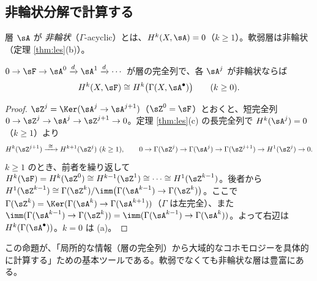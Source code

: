 \subsection{非輪状分解で計算する}
\begin{defn}
層 $\sA$ が \emph{非輪状}（$\Gamma$-acyclic）とは、$H^k(X,\sA)=0$（$k\ge1$）。軟弱層は非輪状（定理 \ref{thm:les}(b)）。
\end{defn}
\begin{prop}[非輪状分解定理]\label{prop:acyclic}\tP
$0\to\sF\to\sA^0\xrightarrow{d}\sA^1\xrightarrow{d}\cdots$ が層の完全列で、各 $\sA^j$ が非輪状ならば
\[
H^k(X,\sF)\cong H^k\big(\Gamma(X,\sA^\bullet)\big)\qquad(k\ge0).
\]
\end{prop}
\begin{proof}
$\sZ^j=\Ker(\sA^j\to\sA^{j+1})$（$\sZ^0=\sF$）とおくと、短完全列 $0\to\sZ^j\to\sA^j\to\sZ^{j+1}\to0$。定理 \ref{thm:les}(c) の長完全列で $H^k(\sA^j)=0$（$k\ge1$）より
\[
H^k(\sZ^{j+1})\xrightarrow{\ \cong\ }H^{k+1}(\sZ^j)\ (k\ge1),\qquad 0\to\Gamma(\sZ^j)\to\Gamma(\sA^j)\to\Gamma(\sZ^{j+1})\to H^1(\sZ^j)\to0.
\]
$k\ge1$ のとき、前者を繰り返して $H^k(\sF)=H^k(\sZ^0)\cong H^{k-1}(\sZ^1)\cong\cdots\cong H^1(\sZ^{k-1})$。後者から $H^1(\sZ^{k-1})\cong\Gamma(\sZ^k)/\imm\big(\Gamma(\sA^{k-1})\to\Gamma(\sZ^k)\big)$。ここで $\Gamma(\sZ^k)=\Ker(\Gamma(\sA^k)\to\Gamma(\sA^{k+1}))$（$\Gamma$ は左完全）、また $\imm(\Gamma(\sA^{k-1})\to\Gamma(\sZ^k))=\imm(\Gamma(\sA^{k-1})\to\Gamma(\sA^k))$。よって右辺は $H^k(\Gamma(\sA^\bullet))$。$k=0$ は (a)。\qedhere
\end{proof}
この命題が、「局所的な情報（層の完全列）から大域的なコホモロジーを具体的に計算する」ための基本ツールである。軟弱でなくても非輪状な層は豊富にある。

